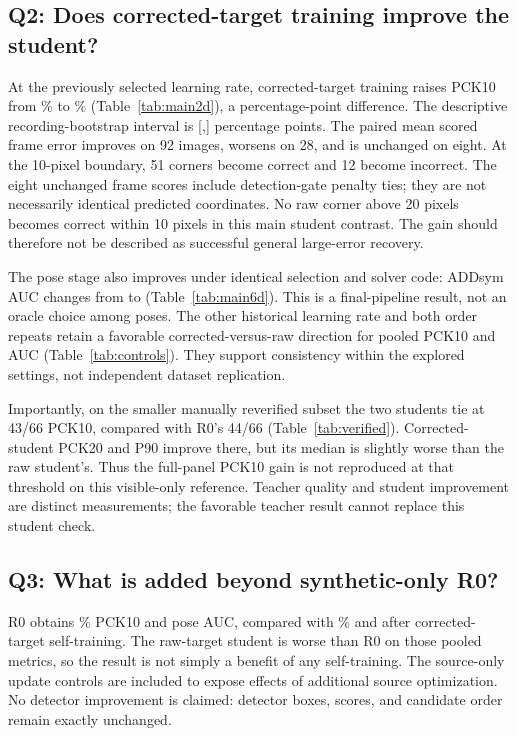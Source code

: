 \documentclass[journal]{IEEEtran}
\begin{document}
\subsection{Q2: Does corrected-target training improve the student?}
At the previously selected learning rate, corrected-target training raises PCK10 from \RawPCK{}\% to \CorrPCK{}\% (Table~\ref{tab:main2d}), a \StudentDelta{} percentage-point difference. The descriptive recording-bootstrap interval is [\CILow{},\CIHigh{}] percentage points. The paired mean scored frame error improves on 92 images, worsens on 28, and is unchanged on eight. At the 10-pixel boundary, 51 corners become correct and 12 become incorrect. The eight unchanged frame scores include detection-gate penalty ties; they are not necessarily identical predicted coordinates. No raw corner above 20 pixels becomes correct within 10 pixels in this main student contrast. The gain should therefore not be described as successful general large-error recovery.

The pose stage also improves under identical selection and solver code: ADDsym AUC changes from \RawAUC{} to \CorrAUC{} (Table~\ref{tab:main6d}). This is a final-pipeline result, not an oracle choice among poses. The other historical learning rate and both order repeats retain a favorable corrected-versus-raw direction for pooled PCK10 and AUC (Table~\ref{tab:controls}). They support consistency within the explored settings, not independent dataset replication.

Importantly, on the smaller manually reverified subset the two students tie at 43/66 PCK10, compared with R0's 44/66 (Table~\ref{tab:verified}). Corrected-student PCK20 and P90 improve there, but its median is slightly worse than the raw student's. Thus the full-panel PCK10 gain is not reproduced at that threshold on this visible-only reference. Teacher quality and student improvement are distinct measurements; the favorable teacher result cannot replace this student check.



\subsection{Q3: What is added beyond synthetic-only R0?}
R0 obtains \BasePCK{}\% PCK10 and \BaseAUC{} pose AUC, compared with \CorrPCK{}\% and \CorrAUC{} after corrected-target self-training. The raw-target student is worse than R0 on those pooled metrics, so the result is not simply a benefit of any self-training. The source-only update controls are included to expose effects of additional source optimization. No detector improvement is claimed: detector boxes, scores, and candidate order remain exactly unchanged.
\end{document}

